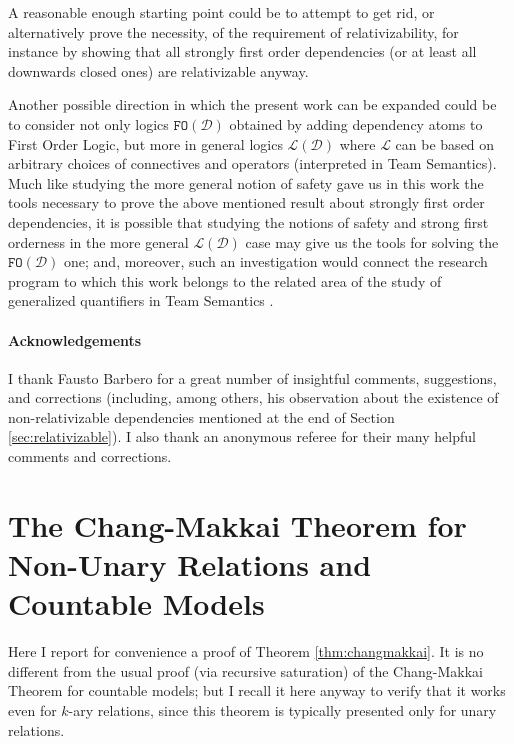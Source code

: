 \documentclass{article}
\theoremstyle{definition}
\newcommand{\FO}{\texttt{FO}}
\newcommand{\DD}{\mathcal D}
\newcommand{\LL}{\mathcal L}
\begin{document}
A reasonable enough starting point could be to attempt to get rid, or alternatively prove the necessity, of the requirement of relativizability, for instance by showing that all strongly first order dependencies (or at least all downwards closed ones) are relativizable anyway. 

Another possible direction in which the present work can be expanded could be to consider not only logics $\FO(\DD)$ obtained by adding dependency atoms to First Order Logic, but more in general logics $\LL(\DD)$ where $\LL$ can be based on arbitrary choices of connectives and operators (interpreted in Team Semantics). Much like studying the more general notion of safety gave us in this work the tools necessary to prove the above mentioned result about strongly first order dependencies, it is possible that studying the notions of safety and strong first orderness in the more general $\LL(\DD)$ case may give us the tools for solving the $\FO(\DD)$ one; and, moreover, such an investigation would connect the research program to which this work belongs to the related area of the study of generalized quantifiers in Team Semantics \cite{engstrom12,kuusisto2015,engstrom2017dependence,barbero2017some}. 

		\paragraph{Acknowledgements} I thank Fausto Barbero for a great number of insightful comments, suggestions, and corrections (including, among others, his observation about the existence of non-relativizable dependencies mentioned at the end of Section \ref{sec:relativizable}). I also thank an anonymous referee for their many helpful comments and corrections. 


\appendix
\section{The Chang-Makkai Theorem for Non-Unary Relations and Countable Models}
Here I report for convenience a proof of Theorem \ref{thm:changmakkai}. It is no different from the usual proof (via recursive saturation) of the Chang-Makkai Theorem for countable models; but I recall it here anyway to verify that it works even for $k$-ary relations, since this theorem is typically presented only for unary relations. %
\end{document}
